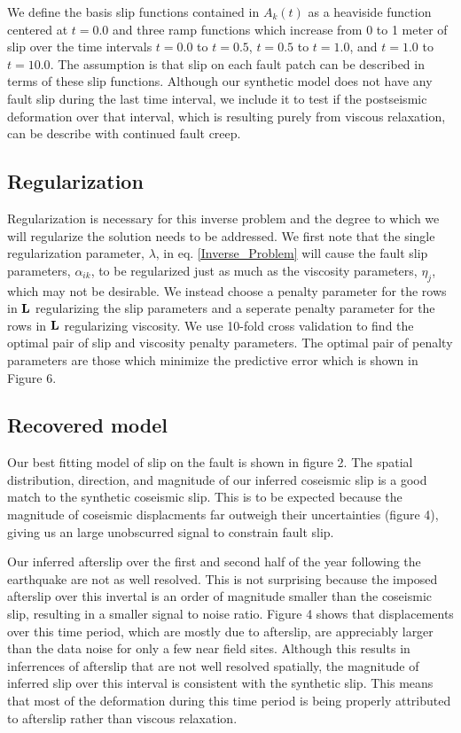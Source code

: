 \documentclass[12pt]{article}
\begin{document}
We define the basis slip functions contained in $A_k(t)$ as a
heaviside function centered at $t=0.0$ and three ramp functions which
increase from 0 to 1 meter of slip over the time intervals $t=0.0$ to
$t=0.5$, $t=0.5$ to $t=1.0$, and $t=1.0$ to $t=10.0$.  The assumption
is that slip on each fault patch can be described in terms of these
slip functions.  Although our synthetic model does not have any fault
slip during the last time interval, we include it to test if the
postseismic deformation over that interval, which is resulting purely
from viscous relaxation, can be describe with continued fault creep.

\subsection{Regularization}
Regularization is necessary for this inverse problem and the degree to
which we will regularize the solution needs to be addressed.  We first
note that the single regularization parameter, $\lambda$, in
eq. \ref{Inverse_Problem} will cause the fault slip parameters,
$\alpha_{ik}$, to be regularized just as much as the viscosity
parameters, $\eta_j$, which may not be desirable.  We instead choose a
penalty parameter for the rows in $\bold{L}$ regularizing the slip
parameters and a seperate penalty parameter for the rows in $\bold{L}$
regularizing viscosity.  We use 10-fold cross validation to find the
optimal pair of slip and viscosity penalty parameters. The optimal
pair of penalty parameters are those which minimize the predictive
error which is shown in Figure 6.  

\subsection{Recovered model}

Our best fitting model of slip on the fault is shown in figure 2.  The
spatial distribution, direction, and magnitude of our inferred
coseismic slip is a good match to the synthetic coseismic slip.  This
is to be expected because the magnitude of coseismic displacments far
outweigh their uncertainties (figure 4), giving us an large
unobscurred signal to constrain fault slip.  

Our inferred afterslip over the first and second half of the year
following the earthquake are not as well resolved.  This is not
surprising because the imposed afterslip over this invertal is an
order of magnitude smaller than the coseismic slip, resulting in a
smaller signal to noise ratio.  Figure 4 shows that displacements over
this time period, which are mostly due to afterslip, are appreciably
larger than the data noise for only a few near field sites.  Although
this results in inferrences of afterslip that are not well resolved
spatially, the magnitude of inferred slip over this interval is
consistent with the synthetic slip.  This means that most of the
deformation during this time period is being properly attributed to
afterslip rather than viscous relaxation.
\end{document}
